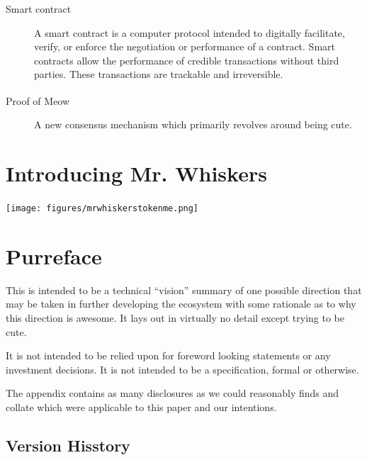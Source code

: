 \documentclass[9pt,oneside]{amsart}
\newenvironment{Figure}
  {\par\medskip\noindent\minipage{\linewidth}}
  {\endminipage\par\medskip}
\begin{document}
\begin{multicols}{2}
\begin{description}
    \item[Smart contract] A smart contract is a computer protocol intended to digitally facilitate, verify, or enforce the negotiation or performance of a contract. Smart contracts allow the performance of credible transactions without third parties. These transactions are trackable and irreversible.
    
    \item[Proof of Meow\textsuperscript{\textregistered}] A new consensus mechanism which primarily revolves around being cute.
\end{description}

\section{Introducing Mr. Whiskers}\label{sec:whiskers}
\begin{Figure}
    \medskip
    \centering
    \texttt{[image: figures/mrwhiskerstokenme.png]}
    \medskip
\end{Figure} 


\section{Purreface}\label{sec:preface}
 This is intended to be a technical ``vision'' summary of one possible direction that may be taken in further developing the \meow{} ecosystem with some rationale as to why this direction is awesome. It lays out in virtually no detail except trying to be cute.

 It is not intended to be relied upon for foreword looking statements or any investment decisions. It is not intended to be a specification, formal or otherwise. 

 The appendix contains as many disclosures as we could reasonably finds and collate which were applicable to this paper and our intentions.


\subsection{Version Hisstory}\label{subsec:history}


\end{multicols}
\end{document}
